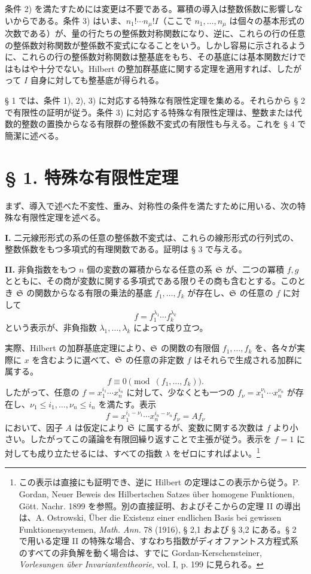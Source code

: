 \documentclass[11pt]{article}
\begin{document}
条件 2) を満たすためには変更は不要である。冪積の導入は整数係数に影響しないからである。条件 3) はいま、\(n_1!\cdots n_\mu! I\)（ここで \(n_1,\ldots,n_\mu\) は個々の基本形式の次数である）が、量の行たちの整係数対称関数になり、逆に、これらの行の任意の整係数対称関数が整係数不変式になることをいう。しかし容易に示されるように、これらの行の整係数対称関数は整基底をもち、その基底には基本関数だけではもはや十分でない。Hilbert の整加群基底に関する定理を適用すれば、したがって \(I\) 自身に対しても整基底が得られる。

§ 1 では、条件 1), 2), 3) に対応する特殊な有限性定理を集める。それらから § 2 で有限性の証明が従う。条件 3) に対応する特殊な有限性定理は、整数または代数的整数の置換からなる有限群の整係数不変式の有限性も与える。これを § 4 で簡潔に述べる。

\section*{§ 1. 特殊な有限性定理}

まず、導入で述べた不変性、重み、対称性の条件を満たすために用いる、次の特殊な有限性定理を述べる。

\textbf{I.} 二元線形形式の系の任意の整係数不変式は、これらの線形形式の行列式の、整数係数をもつ多項式的有理関数である。証明は § 3 で与える。

\textbf{II.} 非負指数をもつ \(n\) 個の変数の冪積からなる任意の系 \(\mathfrak S\) が、二つの冪積 \(f,g\) とともに、その商が変数に関する多項式である限りその商も含むとする。このとき \(\mathfrak S\) の関数からなる有限の乗法的基底 \(f_1,\ldots,f_k\) が存在し、\(\mathfrak S\) の任意の \(f\) に対して
\[
        f=f_1^{\lambda_1}\cdots f_k^{\lambda_k}
\]
という表示が、非負指数 \(\lambda_1,\ldots,\lambda_k\) によって成り立つ。

実際、Hilbert の加群基底定理により、\(\mathfrak S\) の関数の有限個 \(f_1,\ldots,f_k\) を、各々が実際に \(x\) を含むように選べて、\(\mathfrak S\) の任意の非定数 \(f\) はそれらで生成される加群に属する。
\[
        f\equiv0\pmod{(f_1,\ldots,f_k)}.
\]
したがって、任意の \(f=x_1^{i_1}\cdots x_n^{i_n}\) に対して、少なくとも一つの \(f_\nu=x_1^{\nu_1}\cdots x_n^{\nu_n}\) が存在し、\(\nu_1\le i_1,\ldots,\nu_n\le i_n\) を満たす。表示
\[
        f=x_1^{i_1-\nu_1}\cdots x_n^{i_n-\nu_n} f_\nu = A f_\nu
\]
において、因子 \(A\) は仮定により \(\mathfrak S\) に属するが、変数に関する次数は \(f\) より小さい。したがってこの議論を有限回繰り返すことで主張が従う。表示を \(f=1\) に対しても成り立たせるには、すべての指数 \(\lambda\) をゼロにすればよい。\footnote{この表示は直接にも証明でき、逆に Hilbert の定理はこの表示から従う。P. Gordan, Neuer Beweis des Hilbertschen Satzes über homogene Funktionen, Gött. Nachr. 1899 を参照。別の直接証明、およびそこからの定理 II の導出は、A. Ostrowski, Über die Existenz einer endlichen Basis bei gewissen Funktionensystemen, \emph{Math. Ann.} 78 (1916), § 2,1 および § 3,2 にある。§ 2 で用いる定理 II の特殊な場合、すなわち指数がディオファントス方程式系のすべての非負解を動く場合は、すでに Gordan-Kerschensteiner, \emph{Vorlesungen über Invariantentheorie}, vol. I, p. 199 に見られる。}
\end{document}
